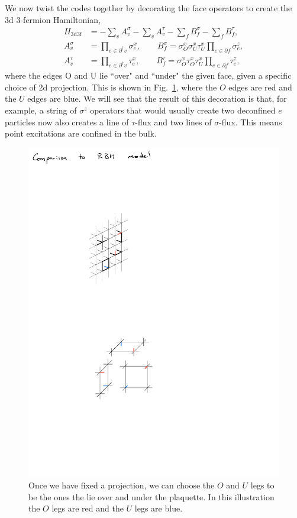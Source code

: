 \documentclass[twocolumn, longbibliography]{revtex4-2}
\newcommand{\nn}{\nonumber\\}
\newcommand{\tdtf}{\text{3d3f}}
\newcommand{\pardag}{\partial^\dagger\!}
\begin{document}
We now twist the codes together by decorating the face operators to create the 3d 3-fermion Hamiltonian,
\begin{align}
H_{\tdtf} &= -\sum_vA_v^{\sigma}-\sum_vA_v^{\tau}-\sum_fB_f^{\sigma}-\sum_fB_f^{\tau},\nn
A_v^{\sigma} &= \prod_{e\in \pardag v}\sigma_e^x, \qquad B_f^{\sigma} = \sigma_O^x\sigma_U^x\tau_U^x\prod_{e\in\partial f}\sigma_e^z,\nn
A_v^{\tau} &= \prod_{e\in \pardag v}\tau_e^x, \qquad B_f^{\tau} = \sigma^x_O\tau^x_O\tau^x_U\prod_{e\in\partial f}\tau_e^z, \label{eqn:3d3f}
\end{align}
where the edges O and U lie ``over" and ``under" the given face, given a specific choice of 2d projection. This is shown in Fig.~\ref{fig:legs}, where the $O$ edges are red and the $U$ edges are blue. We will see that the result of this decoration is that, for example, a string of $\sigma^z$ operators that would usually create two deconfined $e$ particles now also creates a line of $\tau$-flux and two lines of $\sigma$-flux. This means point excitations are confined in the bulk.

\begin{figure}
\centering
\includegraphics[width=\linewidth]{legs}
\caption{Once we have fixed a projection, we can choose the $O$ and $U$ legs to be the ones the lie over and under the plaquette. In this illustration the $O$ legs are red and the $U$ legs are blue.}
\label{fig:legs}
\end{figure}
\end{document}
